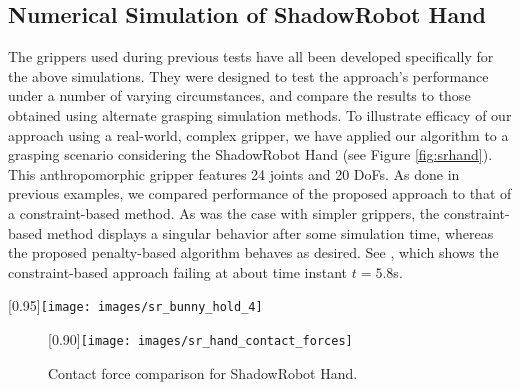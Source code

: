 \subsection{Numerical Simulation of ShadowRobot Hand}\label{sec:sr_hand}

The grippers used during previous tests have all been developed specifically for the above simulations. They were designed to test the approach's performance under a number of varying circumstances, and compare the results to those obtained using alternate grasping simulation methods. To illustrate efficacy of our approach using a real-world, complex gripper, we have applied our algorithm to a grasping scenario considering the ShadowRobot Hand (see Figure \ref{fig:srhand}). This anthropomorphic gripper features 24 joints and 20 DoFs. As done in previous examples, we compared performance of the proposed approach to that of a constraint-based method. As was the case with simpler grippers, the constraint-based method displays a singular behavior after some simulation time, whereas the proposed penalty-based algorithm behaves as desired. See , which shows the constraint-based approach failing at about time instant $t=5.8$s.
%
%
\begin{figure*}
	\centering
	\scalebox{1}[0.95]{\texttt{[image: images/sr\_bunny\_hold\_4]}}
	\caption{ShadowRobot Hand grasping the Stanford bunny model (\cite{levoy2005scanning}).}
	\label{fig:srhand}
\end{figure*}
%
\begin{figure}
	\centering
	\scalebox{1}[0.90]{\texttt{[image: images/sr\_hand\_contact\_forces]}}
	\caption{Contact force comparison for ShadowRobot Hand.}
	\label{fig:srhandcontactforces}
\end{figure}
